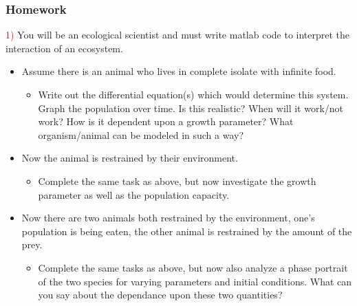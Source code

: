 \documentclass[serif]{beamer}
\begin{document}



\begin{frame}
\frametitle{Homework} 

\textcolor{red}{1)} You will be an ecological scientist and must write matlab code to interpret the interaction of an ecosystem. \\

\begin{itemize}
\item Assume there is an animal who lives in complete isolate with infinite food. 
\begin{itemize}
\item Write out the differential equation(s) which would determine this system. Graph the population over time. Is this realistic? When will it work/not work? How is it dependent upon a growth parameter? What organism/animal can be modeled in such a way? 
\end{itemize}
\item Now the animal is restrained by their environment. 
\begin{itemize}
\item Complete the same task as above, but now investigate the growth parameter as well as the population capacity.
\end{itemize}
\item Now there are two animals both restrained by the environment, one's population is being eaten, the other animal is restrained by the amount of the prey. 
\begin{itemize}
\item Complete the same tasks as above, but now also analyze a phase portrait of the two species for varying parameters and initial conditions. What can you say about the dependance upon these two quantities?
\end{itemize}
\end{itemize}


\end{frame}

\end{document}

